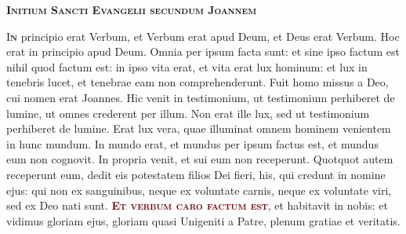\documentclass[12pt,a4paper]{scrartcl}
\begin{document}
\thispagestyle{empty}

\pagecolor{fondpaille}
\color{darkgreen}

\begin{center}

    \begin{minipage}{0.7\linewidth}

        \vspace*{3cm}

        \begin{center}
            \scshape\bfseries\Huge
            Initium Sancti Evangelii secundum Joannem
        \end{center}

        \vspace*{0.2cm}

        \LARGE\justify

        \lettrine[lines=3]{\color{Maroon}I}{\bfseries\color{Maroon}n} principio
        erat Verbum, et Verbum erat apud Deum, et Deus erat Verbum. Hoc erat in
        principio apud Deum. Omnia per ipsum facta sunt: et sine ipso factum est
        nihil quod factum est: in ipso vita erat, et vita erat lux hominum: et
        lux in tenebris lucet, et tenebrae eam non comprehenderunt. Fuit homo
        missus a Deo, cui nomen erat Joannes. Hic venit in testimonium, ut
        testimonium perhiberet de lumine, ut omnes crederent per illum. Non erat
        ille lux, sed ut testimonium perhiberet de lumine. Erat lux vera, quae
        illuminat omnem hominem venientem in hunc mundum. In mundo erat, et
        mundus per ipsum factus est, et mundus eum non cognovit. In propria
        venit, et sui eum non receperunt. Quotquot autem receperunt eum, dedit
        eis potestatem filios Dei fieri, his, qui credunt in nomine ejus: qui
        non ex sanguinibus, neque ex voluntate carnis, neque ex voluntate viri,
        sed ex Deo nati sunt.
        \textcolor{Maroon}{\textbf{\textsc{Et verbum caro factum est}}},
        et habitavit in nobis: et vidimus gloriam ejus, gloriam quasi Unigeniti
        a Patre, plenum gratiae et veritatis.
    \end{minipage}
\end{center}

\vspace*{1cm}
\end{document}
